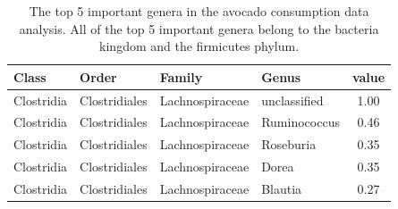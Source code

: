 \documentclass[smallextended]{svjour3}
\begin{document}

\begin{table}[h]
    \centering
\begin{tabular}{l l l l c}
\hline
Class & Order & Family & Genus & value\\
\hline
Clostridia & Clostridiales & Lachnospiraceae & unclassified & 1.00\\
Clostridia & Clostridiales & Lachnospiraceae & Ruminococcus & 0.46\\
Clostridia & Clostridiales & Lachnospiraceae & Roseburia & 0.35\\
Clostridia & Clostridiales & Lachnospiraceae & Dorea & 0.35\\
Clostridia & Clostridiales & Lachnospiraceae & Blautia & 0.27\\
\hline
\end{tabular}
\caption{The top 5 important genera in the avocado consumption data analysis. All of the top 5 important genera belong to the bacteria kingdom and the firmicutes phylum.}\label{AvocadoFI}
\end{table}

\clearpage



\end{document}
